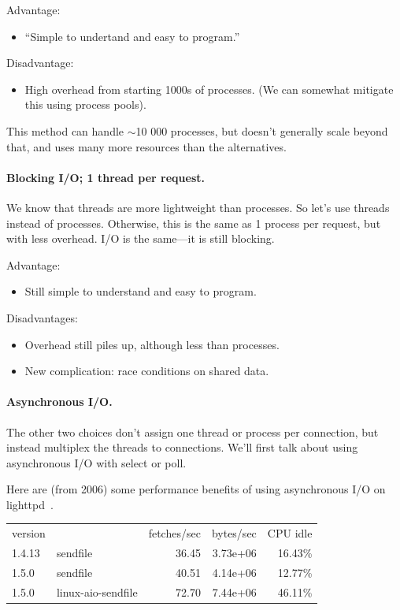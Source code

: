 \documentclass[a4paper]{report}
\begin{document}
Advantage: 
  \begin{itemize}
    \item ``Simple to undertand and easy to program.''
  \end{itemize}

Disadvantage:
  \begin{itemize}
    \item High overhead from starting 1000s of processes.
      (We can somewhat mitigate this using process pools).
  \end{itemize}
This method can handle $\sim$10 000 processes, but doesn't generally scale beyond that, and
uses many more resources than the alternatives.

\paragraph{Blocking I/O; 1 thread per request.}
    We know that threads are more lightweight than processes. So let's use threads instead
of processes. Otherwise, this is the same as 1 process per request, but with less overhead.
I/O is the same---it is still blocking.

    Advantage:
    \begin{itemize}
      \item Still simple to understand and easy to program.
    \end{itemize}

    Disadvantages:
    \begin{itemize}
      \item Overhead still piles up, although less than processes.
      \item New complication: race conditions on shared data.
    \end{itemize}

\paragraph{Asynchronous I/O.} The other two choices don't assign one thread or process per connection,
but instead multiplex the threads to connections. We'll first talk
about using asynchronous I/O with select or poll.  

Here are (from 2006) some performance benefits of using asynchronous
I/O on lighttpd~\cite{lttpd}.

    \begin{tabular}{llrrr}
    version & & fetches/sec & bytes/sec & CPU idle \\
    1.4.13 & sendfile & 36.45 & 3.73e+06 & 16.43\% \\
    1.5.0 & sendfile & 40.51 & 4.14e+06 & 12.77\% \\
    1.5.0 & linux-aio-sendfile & 72.70 & 7.44e+06 & 46.11\% \\
    \end{tabular}
\end{document}
